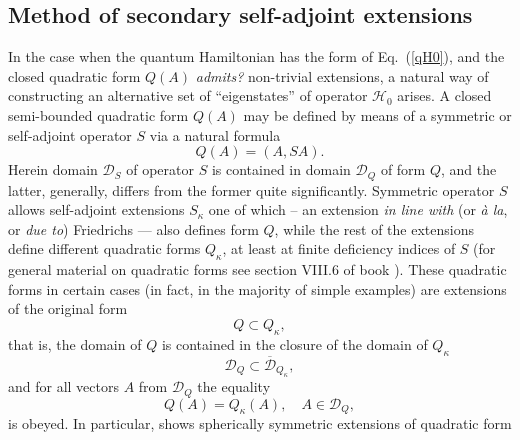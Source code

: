 \documentclass[12pt]{article}
\newcommand{\ol}{\overline}
\newcommand{\DD}{\mathcal{D}}
\newcommand{\HH}{\mathscr{H}}
\begin{document}
\subsection{Method of secondary self-adjoint extensions}
	In the case when the quantum Hamiltonian has the form of 
Eq.~(\ref{qH0}),
	and the closed quadratic form
$ Q(A) $
	{\it admits?} non-trivial extensions,
	a natural way of constructing an alternative set of ``eigenstates''
	of operator
$ \HH_{0} $ arises.
	A closed semi-bounded quadratic form
$ Q(A) $
	may be defined by means of a symmetric or self-adjoint operator
$ S $
	via a natural formula
\begin{equation*}
    Q(A) = (A,SA) .
\end{equation*}
	Herein domain
$ \DD_{S} $
	of operator
$ S $
	is contained in domain
$ \DD_{Q} $
	of form
$ Q $,
	and the latter, generally, differs from the former quite significantly.
	Symmetric operator
$ S $
	allows self-adjoint extensions
$ S_{\kappa} $
	one of which -- an extension {\it in line with} (or {\it \`a la}, or {\it due to}) Friedrichs
\cite{FStone} ---
	also defines form
$ Q $,
	while the rest of the extensions
	define different quadratic forms
$ Q_{\kappa} $, at least at finite deficiency indices of 
$ S $
(for general material on quadratic forms see section VIII.6 of book
\cite{RS1}).
	These quadratic forms in certain cases (in fact, in the majority of simple examples)
	are extensions of the original form
\begin{equation*}
    Q \subset Q_{\kappa} ,
\end{equation*}
	that is, the domain of 
$ Q $
	is contained in the closure of the domain of 
$ Q_{\kappa} $
\begin{equation*}
    \DD_{Q} \subset \ol{\DD}_{Q_{\kappa}} ,
\end{equation*}
	and for all vectors
$ A $ from
$ \DD_{Q} $
	the equality
\begin{equation*}
    Q(A) = Q_{\kappa}(A) ,\quad A\in \DD_{Q} ,
\end{equation*}
	is obeyed.
	In particular, 
\cite{Inv}
	shows spherically symmetric extensions of quadratic form
\end{document}
